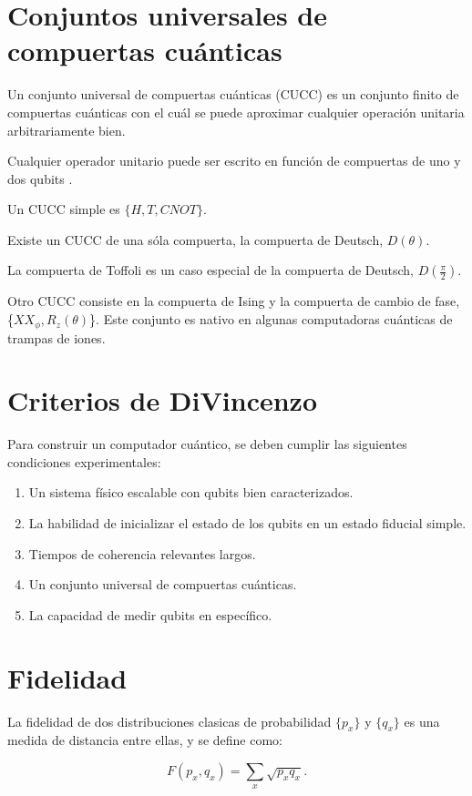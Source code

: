 \section{Conjuntos universales de compuertas cuánticas}
Un conjunto universal de compuertas cuánticas (CUCC) es un conjunto finito de compuertas cuánticas con el cuál se puede aproximar cualquier operación unitaria arbitrariamente bien.

Cualquier operador unitario puede ser escrito en función de compuertas de uno y dos qubits \cite{barenco}.

Un CUCC simple es $\{H,T,\mathit{CNOT}\}$.

Existe un CUCC de una sóla compuerta, la compuerta de Deutsch, $D(\theta)$.

La compuerta de Toffoli es un caso especial de la compuerta de Deutsch, $D(\frac{\pi}{2})$.

Otro CUCC consiste en la compuerta de Ising y la compuerta de cambio de fase, \{$\mathit{XX}_\phi,R_z(\theta)$\}. Este conjunto es nativo en algunas computadoras cuánticas de trampas de iones.

\section{Criterios de DiVincenzo}
Para construir un computador cuántico, se deben cumplir las siguientes condiciones experimentales:

\begin{enumerate}
    \item Un sistema físico escalable con qubits bien caracterizados.
    \item La habilidad de inicializar el estado de los qubits en un estado fiducial simple.
    \item Tiempos de coherencia relevantes largos.
    \item Un conjunto universal de compuertas cuánticas.
    \item La capacidad de medir qubits en específico.
\end{enumerate}

\section{Fidelidad}

La fidelidad de dos distribuciones clasicas de probabilidad $\{p_x\}$ y $\{q_x\}$ es una medida de distancia entre ellas, y se define como:

\begin{equation}
    F(p_x, q_x) = \sum\limits_x \sqrt{p_x q_x} .
\end{equation}

